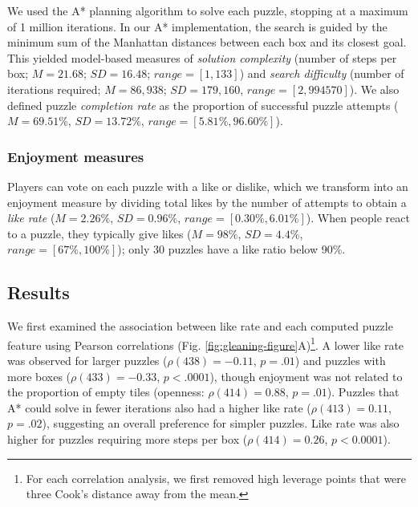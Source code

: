 \documentclass[10pt,letterpaper]{article}
\newcommand{\kz}[1]{{\color{blue}KZ: #1}}
\begin{document}
We used the A* planning algorithm \cite{hart1968formal, todd2023level} to solve each puzzle, stopping at a maximum of 1 million iterations. 
In our A* implementation, the search is guided by the minimum sum of the Manhattan distances between each box and its closest goal.
This yielded model-based measures of \textit{solution complexity} (number of steps per box; $M = 21.68$; $SD=16.48$; $range = [1, 133]$) and \textit{search difficulty} (number of iterations required; $M = 86,938$; $SD = 179,160$, $range = [2, 994570]$). %
We also defined puzzle \textit{completion rate} as the proportion of successful puzzle attempts ($M =69.51\%$, $SD = 13.72\%$, $range = [5.81\%, 96.60\%]$). 

\subsubsection{Enjoyment measures}
Players can vote on each puzzle with a like or dislike, which we transform into an enjoyment measure by dividing total likes by the number of attempts to obtain a \textit{like rate} ($M =2.26\%$, $SD = 0.96\%$, $range =[0.30\%, 6.01\%]$).
When people react to a puzzle, they typically give likes ($M=98\%$, $SD=4.4\%$, $range = [67\%, 100\%]$); only 30 puzzles have a like ratio below 90\%. 

\subsection{Results}

We first examined the association between like rate and each computed puzzle feature using Pearson correlations (Fig. \ref{fig:gleaning-figure}A)\footnote{For each correlation analysis, we first removed high leverage points that were three Cook's distance away from the mean.}. 
A lower like rate was observed for larger puzzles ($\rho(438) =-0.11$, $p=.01$) and puzzles with more boxes ($\rho(433) = -0.33$, $p<.0001$), though enjoyment was not related to the proportion of empty tiles (openness: $\rho(414) = 0.88$, $p=.01$). 
Puzzles that A* could solve in fewer iterations also had a higher like rate ($\rho(413) = 0.11$, $p=.02$), suggesting an overall preference for simpler puzzles. 
Like rate was also higher for puzzles requiring more steps per box ($\rho(414) = 0.26$, $p<0.0001$). 

\end{document}
